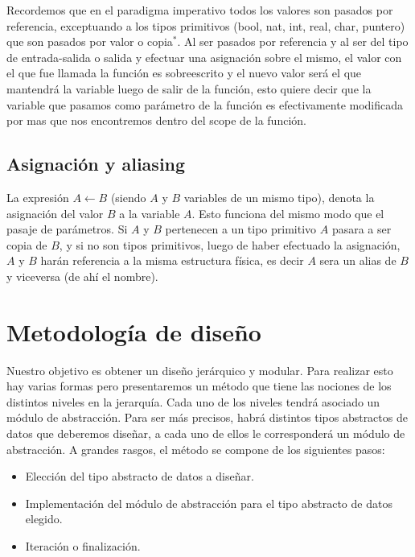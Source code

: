 Recordemos que en el paradigma imperativo todos los valores son pasados por referencia, exceptuando a los tipos primitivos (bool, nat, int, real, char, puntero) que son pasados por valor o copia$^*$. Al ser pasados por referencia y al ser del tipo de entrada-salida o salida y efectuar una asignaci\'on sobre el mismo, el valor con el que fue llamada la funci\'on es sobreescrito y el nuevo valor ser\'a el que mantendr\'a la variable luego de salir de la funci\'on, esto quiere decir que la variable que pasamos como par\'ametro de la funci\'on es efectivamente modificada por mas que nos encontremos dentro del scope de la funci\'on.

\subsection{Asignaci\'on y aliasing}

La expresi\'on $A \gets B$ (siendo $A$ y $B$ variables de un mismo tipo), denota la asignaci\'on del valor $B$ a la variable $A$. Esto funciona del mismo modo que el pasaje de par\'ametros. Si $A$ y $B$ pertenecen a un tipo primitivo $A$ pasara a ser copia de $B$, y si no son tipos primitivos, luego de haber efectuado la asignaci\'on, $A$ y $B$ har\'an referencia a la misma estructura f\'isica, es decir $A$ sera un alias de $B$ y viceversa (de ah\'i el nombre).

\section{Metodolog\'ia de dise\~no}

Nuestro objetivo es obtener un dise\~no jer\'arquico y modular. Para realizar esto hay varias formas pero presentaremos un m\'etodo que tiene las nociones de los distintos niveles en la jerarqu\'ia. Cada uno de los niveles tendr\'a asociado un m\'odulo de abstracci\'on. Para ser m\'as precisos, habr\'a distintos tipos abstractos de datos que deberemos dise\~nar, a cada uno de ellos le corresponder\'a un m\'odulo de abstracci\'on. A grandes rasgos, el m\'etodo se compone de los siguientes pasos:

\begin{itemize}
 \item Elecci\'on del tipo abstracto de datos a dise\~nar.
 \item Implementaci\'on del m\'odulo de abstracci\'on para el tipo abstracto de datos elegido.
 \item Iteraci\'on o finalizaci\'on.
\end{itemize}

